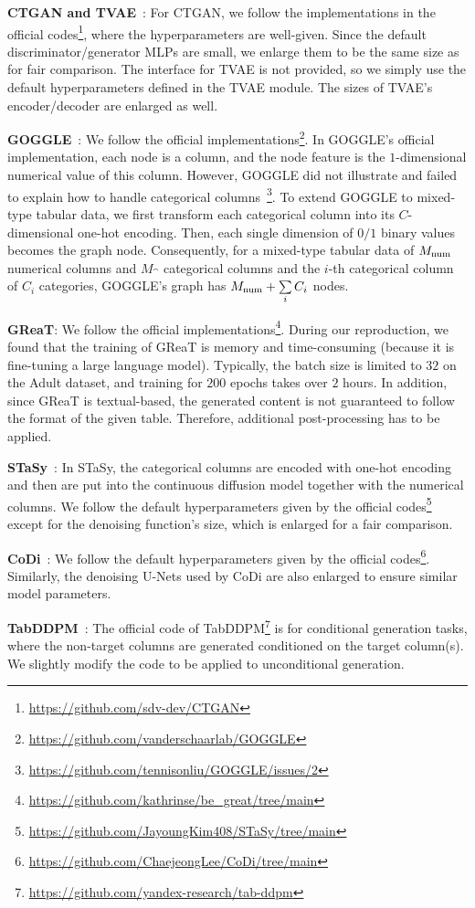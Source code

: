 \textbf{CTGAN and TVAE}~\citep{ctgan}: For CTGAN, we follow the implementations in the official codes\footnote{\url{https://github.com/sdv-dev/CTGAN}}, where the hyperparameters are well-given. Since the default discriminator/generator MLPs are small, we enlarge them to be the same size as \modelname for fair comparison. The interface for TVAE is not provided, so we simply use the default hyperparameters defined in the TVAE module. The sizes of TVAE's encoder/decoder are enlarged as well.

\textbf{GOGGLE}~\citep{goggle}: We follow the official implementations\footnote{\url{https://github.com/vanderschaarlab/GOGGLE}}. In GOGGLE's official implementation, each node is a column, and the node feature is the $1$-dimensional numerical value of this column.  However, GOGGLE did not illustrate and failed to explain how to handle categorical columns~\footnote{\url{https://github.com/tennisonliu/GOGGLE/issues/2}}. To extend GOGGLE to mixed-type tabular data, we first transform each categorical column into its $C$-dimensional one-hot encoding. Then, each single dimension of $0/1$ binary values becomes the graph node. Consequently, for a mixed-type tabular data of $M_{{\rm num}}$ numerical columns and $M_{\cat}$ categorical columns and the $i$-th categorical column of $C_i$ categories, GOGGLE's graph has $M_{{\rm num}} + \sum\limits_{i} C_i$ nodes. 

\textbf{GReaT}: We follow the official implementations\footnote{\url{https://github.com/kathrinse/be_great/tree/main}}. During our reproduction, we found that the training of GReaT is memory and time-consuming (because it is fine-tuning a large language model). Typically, the batch size is limited to $32$ on the Adult dataset, and training for $200$ epochs takes over $2$ hours. In addition, since GReaT is textual-based, the generated content is not guaranteed to follow the format of the given table. Therefore, additional post-processing has to be applied.

\textbf{STaSy}~\citep{stasy}: In STaSy, the categorical columns are encoded with one-hot encoding and then are put into the continuous diffusion model together with the numerical columns. We follow the default hyperparameters given by the official codes\footnote{\url{https://github.com/JayoungKim408/STaSy/tree/main}} except for the denoising function's size, which is enlarged for a fair comparison. 

\textbf{CoDi}~\citep{codi}: We follow the default hyperparameters given by the official codes\footnote{\url{https://github.com/ChaejeongLee/CoDi/tree/main}}. Similarly, the denoising U-Nets used by CoDi are also enlarged to ensure similar model parameters.

\textbf{TabDDPM}~\citep{tabddpm}: The official code of TabDDPM\footnote{\url{https://github.com/yandex-research/tab-ddpm}} is for conditional generation tasks, where the non-target columns are generated conditioned on the target column(s). We slightly modify the code to be applied to unconditional generation.